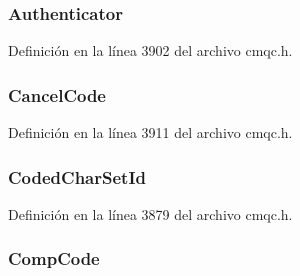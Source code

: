 \hypertarget{structtag_m_q_c_i_h_a17dd634a073ce3c302375cc231a4fcfa}{}
\subsubsection[{Authenticator}]{ Authenticator}\label{structtag_m_q_c_i_h_a17dd634a073ce3c302375cc231a4fcfa}


Definición en la línea 3902 del archivo cmqc.\+h.

\hypertarget{structtag_m_q_c_i_h_a3fbb937db65250e95816614dab1abb4e}{}
\subsubsection[{Cancel\+Code}]{ Cancel\+Code}\label{structtag_m_q_c_i_h_a3fbb937db65250e95816614dab1abb4e}


Definición en la línea 3911 del archivo cmqc.\+h.

\hypertarget{structtag_m_q_c_i_h_a4d8d1961a991850d1355cdf9b4680b8e}{}
\subsubsection[{Coded\+Char\+Set\+Id}]{ Coded\+Char\+Set\+Id}\label{structtag_m_q_c_i_h_a4d8d1961a991850d1355cdf9b4680b8e}


Definición en la línea 3879 del archivo cmqc.\+h.

\hypertarget{structtag_m_q_c_i_h_a3d53860a50c3834d3dad9f5b2e5b5234}{}
\subsubsection[{Comp\+Code}]{ Comp\+Code}\label{structtag_m_q_c_i_h_a3d53860a50c3834d3dad9f5b2e5b5234}


